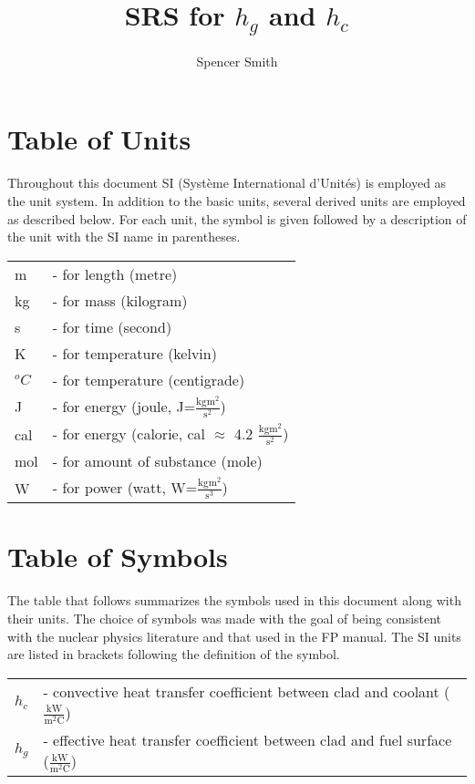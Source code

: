 \documentclass{article}
\title{SRS for $h_g$ and $h_c$}
\author{Spencer Smith}
\newcommand{\blt}{- }
\begin{document}
\maketitle
\section*{Table of Units}
Throughout this document SI (Syst\`{e}me International d'Unit\'{e}s) is employed as the unit system.  In addition to the basic units, several derived units are employed as described below. For each unit, the symbol is given followed by a description of the unit with the SI name in parentheses.
~\newline \begin{longtable}{l p{11cm}}
m & \blt for length (metre)\\
kg & \blt for mass (kilogram)\\
s & \blt for time (second)\\
K & \blt for temperature (kelvin)\\
$^oC$ & \blt for temperature (centigrade)\\
J & \blt for energy (joule, J=$\mathrm{\frac{kg m^2}{s^2}}$)\\
cal & \blt for energy (calorie, cal $\approx$ 4.2 $\mathrm{\frac{kg m^2}{s^2}}$)\\
mol & \blt for amount of substance (mole)\\
W & \blt for power (watt, W=$\mathrm{\frac{kgm^2}{s^3}}$)\\
\end{longtable}
\section*{Table of Symbols}
The table that follows summarizes the symbols used in this document along with their units.  The choice of symbols was made with the goal of being consistent with the nuclear physics literature and that used in the FP manual.  The SI units are listed in brackets following the definition of the symbol.
\begin{longtable}{l p{10.5cm}}
$h_{c}$ & \blt convective heat transfer coefficient between clad and coolant ($\mathrm{\frac{kW}{m^2C}}$)\\
$h_{g}$ & \blt effective heat transfer coefficient between clad and fuel surface ($\mathrm{\frac{kW}{m^2C}}$)
\end{longtable}
\end{document}
